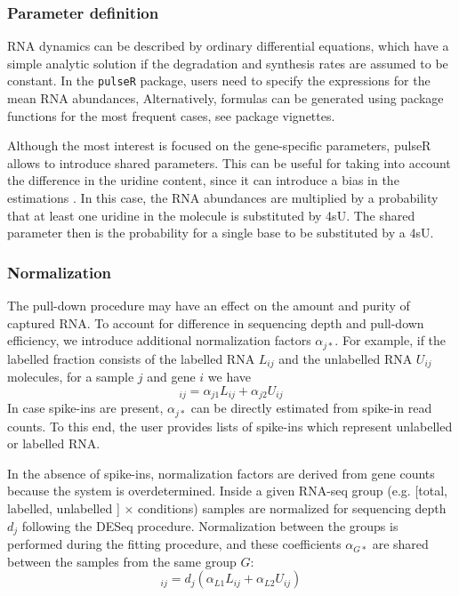 \subsubsection*{Parameter definition}
RNA dynamics can be described by ordinary differential equations,
which have a simple analytic solution 
if the degradation and synthesis rates are assumed to be constant.
In the \verb|pulseR| package,
users need to specify the expressions for the mean RNA abundances,
Alternatively, formulas can be generated using package functions for the 
most frequent cases, see package vignettes. 

Although the most interest is focused on the gene-specific parameters,
pulseR allows to introduce shared parameters.
 This can be useful for taking into account the difference in the uridine content, since
it can introduce a bias in the estimations \citep{miller2011dynamic,
schwalb2012measurement}.
In this case, the RNA abundances are multiplied by 
a probability that at least one uridine in the molecule is substituted by 4sU.
The shared parameter then is the probability for a single base to be substituted
by a 4sU.
\subsubsection*{Normalization}
The pull-down procedure may have an effect on the amount and purity of captured RNA.
To account for difference in sequencing depth and pull-down efficiency,
we introduce additional normalization factors $\alpha_{j*}$. 
 For example, 
if the labelled fraction consists of the labelled RNA $L_{ij}$ and the unlabelled RNA
 $U_{ij}$ molecules, for a sample $j$ and gene $i$ we have 
\begin{equation}
 [\text{labelled fraction}]_{ij}  = \alpha_{j1} L_{ij} + \alpha_{j2} U_{ij}
\end{equation}
In case spike-ins are present, $\alpha_{j*}$  can be directly estimated from spike-in read counts. 
To this end, the user provides lists of spike-ins which represent unlabelled or labelled RNA.
\par
In the absence of spike-ins, 
normalization factors are derived from gene counts
because the system is overdetermined.
Inside a given RNA-seq group (e.g. [total, labelled, unlabelled ] $\times$ conditions) samples are normalized for sequencing depth $d_j$ following the DESeq procedure.
Normalization between the groups is performed during the fitting procedure, 
and these coefficients $\alpha_{G*}$  are shared between the samples from the same group $G$:
\begin{equation}
 [\text{labelled fraction}]_{ij}  = d_j(\alpha_{L1} L_{ij} + \alpha_{L2} U_{ij})
\end{equation}

